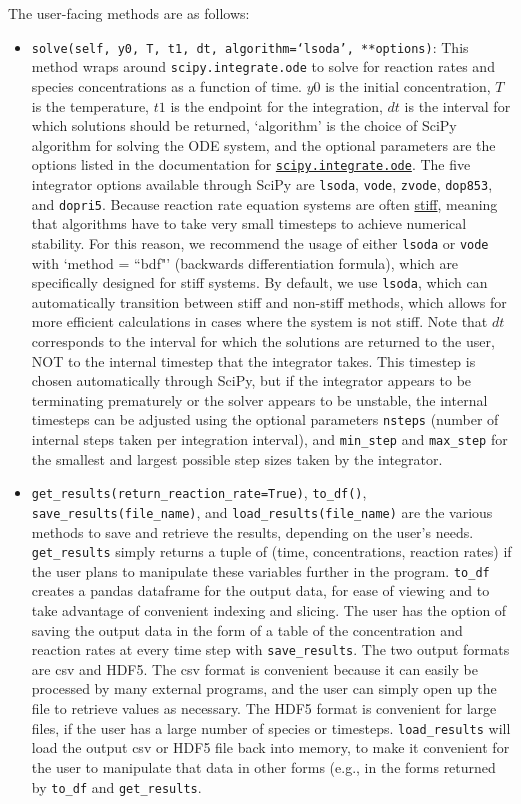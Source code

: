 \documentclass[12pt]{article}
\begin{document}
The user-facing methods are as follows: 
\begin{itemize}
\item \texttt{solve(self, y0, T, t1, dt, algorithm=`lsoda', **options)}: This method wraps around \texttt{scipy.integrate.ode} to solve for reaction rates and species concentrations as a function of time. $y0$ is the initial concentration, $T$ is the temperature, $t1$ is the endpoint for the integration, $dt$ is the interval for which solutions should be returned, `algorithm' is the choice of SciPy algorithm for solving the ODE system, and the optional parameters are the options listed in the documentation for \href{https://docs.scipy.org/doc/scipy/reference/generated/scipy.integrate.ode.html}\texttt{scipy.integrate.ode}. The five integrator options available through SciPy are \texttt{lsoda}, \texttt{vode}, \texttt{zvode}, \texttt{dop853}, and \texttt{dopri5}. Because reaction rate equation systems are often \href{https://www.mathworks.com/help/matlab/math/solve-stiff-odes.html}{stiff}, meaning that algorithms have to take very small timesteps to achieve numerical stability. For this reason, we recommend the usage of either \texttt{lsoda} or \texttt{vode} with `method = ``bdf"' (backwards differentiation formula), which are specifically designed for stiff systems. By default, we use \texttt{lsoda}, which can automatically transition between stiff and non-stiff methods, which allows for more efficient calculations in cases where the system is not stiff. Note that $dt$ corresponds to the interval for which the solutions are returned to the user, NOT to the internal timestep that the integrator takes. This timestep is chosen automatically through SciPy, but if the integrator appears to be terminating prematurely or the solver appears to be unstable, the internal timesteps can be adjusted using the optional parameters \texttt{nsteps} (number of internal steps taken per integration interval), and \texttt{min\_step} and \texttt{max\_step} for the smallest and largest possible step sizes taken by the integrator. 
\item \texttt{get\_results(return\_reaction\_rate=True)}, \texttt{to\_df()}, \texttt{save\_results(file\_name)}, and \texttt{load\_results(file\_name)} are the various methods to save and retrieve the results, depending on the user's needs. \texttt{get\_results} simply returns a tuple of (time, concentrations, reaction rates) if the user plans to manipulate these variables further in the program. \texttt{to\_df} creates a pandas dataframe for the output data, for ease of viewing and to take advantage of convenient indexing and slicing. The user has the option of saving the output data in the form of a table of the concentration and reaction rates at every time step with \texttt{save\_results}. The two output formats are csv and HDF5. The csv format is convenient because it can easily be processed by many external programs, and the user can simply open up the file to retrieve values as necessary. The HDF5 format is convenient for large files, if the user has a large number of species or timesteps. \texttt{load\_results} will load the output csv or HDF5 file back into memory, to make it convenient for the user to manipulate that data in other forms (e.g., in the forms returned by \texttt{to\_df} and \texttt{get\_results}. 

\end{itemize}
\end{document}
